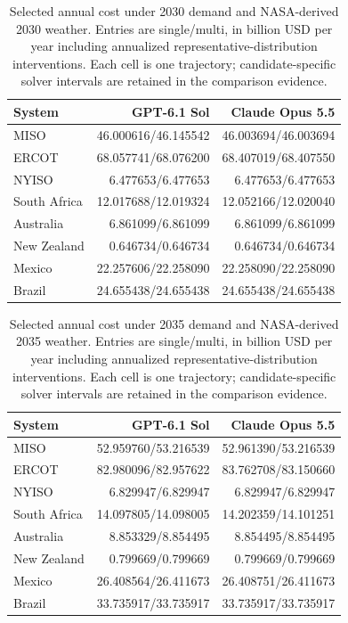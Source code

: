 \documentclass[pdflatex,sn-nature]{sn-jnl}
\begin{document}
\begin{appendices}
\begin{table}[tbp]
\caption{Selected annual cost under 2030 demand and NASA-derived 2030 weather. Entries are single/multi, in billion USD per year including annualized representative-distribution interventions. Each cell is one trajectory; candidate-specific solver intervals are retained in the comparison evidence.}
\label{tab:weather-2030}
\centering\small
\begingroup\setlength{\tabcolsep}{4pt}
\begin{tabular}{@{}lrr@{}}
\toprule
System & GPT-6.1 Sol & Claude Opus 5.5\\
\midrule
MISO & 46.000616/46.145542 & 46.003694/46.003694\\
ERCOT & 68.057741/68.076200 & 68.407019/68.407550\\
NYISO & 6.477653/6.477653 & 6.477653/6.477653\\
South Africa & 12.017688/12.019324 & 12.052166/12.020040\\
Australia & 6.861099/6.861099 & 6.861099/6.861099\\
New Zealand & 0.646734/0.646734 & 0.646734/0.646734\\
Mexico & 22.257606/22.258090 & 22.258090/22.258090\\
Brazil & 24.655438/24.655438 & 24.655438/24.655438\\
\bottomrule
\end{tabular}
\endgroup
\end{table}

\begin{table}[tbp]
\caption{Selected annual cost under 2035 demand and NASA-derived 2035 weather. Entries are single/multi, in billion USD per year including annualized representative-distribution interventions. Each cell is one trajectory; candidate-specific solver intervals are retained in the comparison evidence.}
\label{tab:weather-2035}
\centering\small
\begingroup\setlength{\tabcolsep}{4pt}
\begin{tabular}{@{}lrr@{}}
\toprule
System & GPT-6.1 Sol & Claude Opus 5.5\\
\midrule
MISO & 52.959760/53.216539 & 52.961390/53.216539\\
ERCOT & 82.980096/82.957622 & 83.762708/83.150660\\
NYISO & 6.829947/6.829947 & 6.829947/6.829947\\
South Africa & 14.097805/14.098005 & 14.202359/14.101251\\
Australia & 8.853329/8.854495 & 8.854495/8.854495\\
New Zealand & 0.799669/0.799669 & 0.799669/0.799669\\
Mexico & 26.408564/26.411673 & 26.408751/26.411673\\
Brazil & 33.735917/33.735917 & 33.735917/33.735917\\
\bottomrule
\end{tabular}
\endgroup
\end{table}


\end{appendices}
\end{document}
